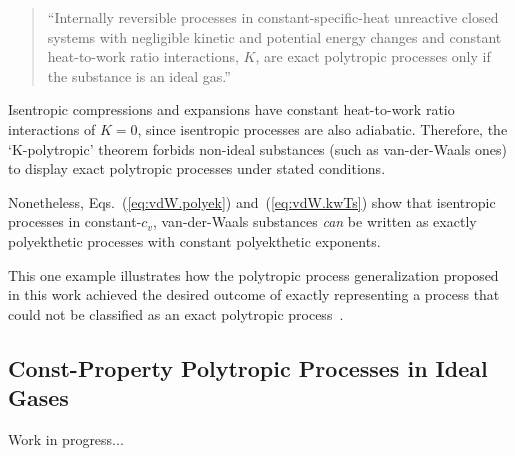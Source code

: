     \begin{quote}
        ``Internally reversible processes in constant-specific-heat  unreactive  closed  systems
        with negligible kinetic and potential energy changes  and  constant  heat-to-work  ratio
        interactions, $K$, are exact polytropic processes only if  the  substance  is  an  ideal
        gas.''
    \end{quote}

    Isentropic compressions and expansions have  constant  heat-to-work  ratio  interactions  of
    $K=0$, since isentropic processes are also adiabatic. Therefore, the `K-polytropic'  theorem
    forbids non-ideal substances (such  as  van-der-Waals  ones)  to  display  exact  polytropic
    processes under stated conditions.

    Nonetheless,  Eqs.~(\ref{eq:vdW.polyek})  and~(\ref{eq:vdW.kwTs})   show   that   isentropic
    processes in constant-$c_v$, van-der-Waals  substances  \emph{can}  be  written  as  exactly
    polyekthetic processes with constant polyekthetic exponents.

    This one example illustrates how the polytropic process generalization proposed in this work
    achieved the desired outcome of exactly representing a process that could not be  classified
    as an exact polytropic process~\cite{2020-NaaktgeborenC-engrXiv}.

    \subsection{Const-Property Polytropic Processes in Ideal Gases}

    Work in progress...


